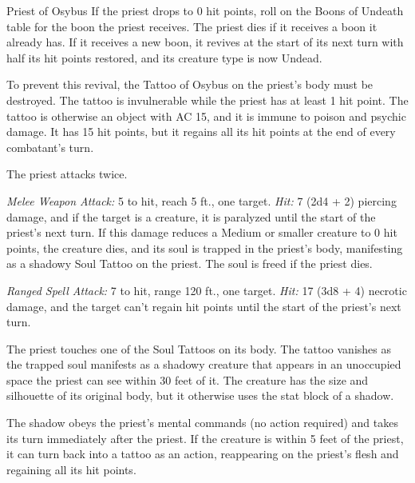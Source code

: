 \documentclass[10pt,a4paper,twoside,bg=print,twocolumn,openany,nodeprecatedcode]{dndbook}
\begin{document}
\begin{DndMonster}[float=t]{Priest of Osybus}
\DndMonsterBasics[
armor-class = {14 (natural armor)},
hit-points = {\DndDice{8d8 + 24}},
speed = {30 ft.}
]
\DndMonsterAbilityScores[
 str = 10,
 dex = 14,
 con = 16,
 int = 18,
 wis = 17,
 cha = 11
]
\DndMonsterDetails[
saving-throws = {Int +7, Wis +6, Cha +3},
condition-immunities = {frightened},
senses = {darkvision 120 ft., passive perception 13},
languages = {any three languages},
challenge = 6,
]
If the priest drops to 0 hit points, roll on the Boons of Undeath table for the boon the priest receives. The priest dies if it receives a boon it already has. If it receives a new boon, it revives at the start of its next turn with half its hit points restored, and its creature type is now Undead.

To prevent this revival, the Tattoo of Osybus on the priest's body must be destroyed. The tattoo is invulnerable while the priest has at least 1 hit point. The tattoo is otherwise an object with AC 15, and it is immune to poison and psychic damage. It has 15 hit points, but it regains all its hit points at the end of every combatant's turn.

The priest attacks twice.

\textsl{Melee Weapon Attack:} 5 to hit, reach 5 ft., one target. \textsl{Hit:} 7 (2d4 + 2) piercing damage, and if the target is a creature, it is paralyzed until the start of the priest's next turn. If this damage reduces a Medium or smaller creature to 0 hit points, the creature dies, and its soul is trapped in the priest's body, manifesting as a shadowy Soul Tattoo on the priest. The soul is freed if the priest dies.

\textsl{Ranged Spell Attack:} 7 to hit, range 120 ft., one target. \textsl{Hit:} 17 (3d8 + 4) necrotic damage, and the target can't regain hit points until the start of the priest's next turn.

The priest touches one of the Soul Tattoos on its body. The tattoo vanishes as the trapped soul manifests as a shadowy creature that appears in an unoccupied space the priest can see within 30 feet of it. The creature has the size and silhouette of its original body, but it otherwise uses the stat block of a shadow.

The shadow obeys the priest's mental commands (no action required) and takes its turn immediately after the priest. If the creature is within 5 feet of the priest, it can turn back into a tattoo as an action, reappearing on the priest's flesh and regaining all its hit points.

\end{DndMonster}
\end{document}
